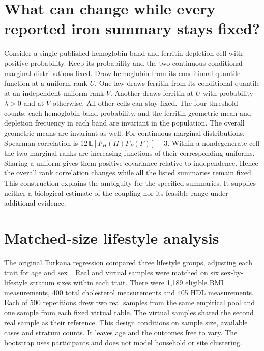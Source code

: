 \section{What can change while every reported iron summary stays fixed?}
\label{app:ironproof}
Consider a single published hemoglobin band and ferritin-depletion cell with positive probability. Keep its probability and the two continuous conditional marginal distributions fixed. Draw hemoglobin from its conditional quantile function at a uniform rank $U$. One law draws ferritin from its conditional quantile at an independent uniform rank $V$. Another draws ferritin at $U$ with probability $\lambda>0$ and at $V$ otherwise. All other cells can stay fixed. The four threshold counts, each hemoglobin-band probability, and the ferritin geometric mean and depletion frequency in each band are invariant in the population. The overall geometric means are invariant as well.
For continuous marginal distributions, Spearman correlation is $12\,\mathbb{E}[F_H(H)F_F(F)]-3$. Within a nondegenerate cell the two marginal ranks are increasing functions of their corresponding uniforms. Sharing a uniform gives them positive covariance relative to independence. Hence the overall rank correlation changes while all the listed summaries remain fixed. This construction explains the ambiguity for the specified summaries. It supplies neither a biological estimate of the coupling nor its feasible range under additional evidence.

\section{Matched-size lifestyle analysis}
\label{app:lifestyle}
The original Turkana regression compared three lifestyle groups, adjusting each trait for age and sex~\cite{lea}. Real and virtual samples were matched on six sex-by-lifestyle stratum sizes within each trait. There were 1,189 eligible BMI measurements, 400 total cholesterol measurements and 405 HDL measurements. Each of 500 repetitions drew two real samples from the same empirical pool and one sample from each fixed virtual table. The virtual samples shared the second real sample as their reference. This design conditions on sample size, available cases and stratum counts. It leaves age and the outcomes free to vary. The bootstrap uses participants and does not model household or site clustering.



